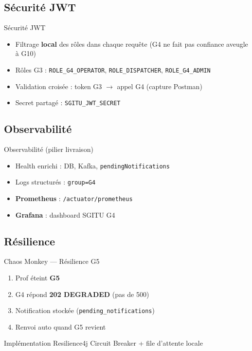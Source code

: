 \documentclass[aspectratio=169,xcolor=table]{beamer}
\begin{document}
\subsection{Sécurité JWT}

\begin{frame}{Sécurité JWT}
  \begin{itemize}
    \item Filtrage \textbf{local} des rôles dans chaque requête (G4 ne fait pas confiance aveugle à G10)
    \item Rôles G3 : \texttt{ROLE\_G4\_OPERATOR}, \texttt{ROLE\_DISPATCHER}, \texttt{ROLE\_G4\_ADMIN}
    \item Validation croisée : token G3 $\rightarrow$ appel G4 (capture Postman)
    \item Secret partagé : \texttt{SGITU\_JWT\_SECRET}
  \end{itemize}
\end{frame}

\subsection{Observabilité}

\begin{frame}{Observabilité (pilier livraison)}
  \begin{itemize}
    \item Health enrichi : DB, Kafka, \texttt{pendingNotifications}
    \item Logs structurés : \texttt{group=G4}
    \item \textbf{Prometheus} : \texttt{/actuator/prometheus}
    \item \textbf{Grafana} : dashboard SGITU G4
  \end{itemize}
\end{frame}

\subsection{Résilience}

\begin{frame}{Chaos Monkey — Résilience G5}
  \begin{enumerate}
    \item Prof éteint \textbf{G5}
    \item G4 répond \textbf{202 DEGRADED} (pas de 500)
    \item Notification stockée (\texttt{pending\_notifications})
    \item Renvoi auto quand G5 revient
  \end{enumerate}
  \vspace{0.3cm}
  \begin{block}{Implémentation}
    \small Resilience4j Circuit Breaker + file d'attente locale
  \end{block}
\end{frame}
\end{document}
